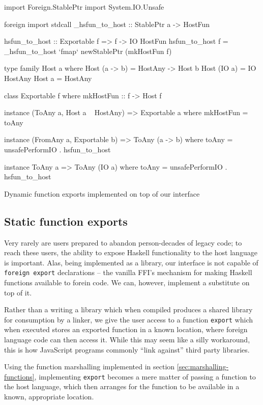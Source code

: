 \documentclass[preprint]{sigplanconf}
\begin{document}
\begin{listingfloat}
\begin{code}
import Foreign.StablePtr
import System.IO.Unsafe

foreign import stdcall
  _hsfun_to_host :: StablePtr a -> HostFun

hsfun_to_host :: Exportable f => f -> IO HostFun
hsfun_to_host f =
  _hsfun_to_host `fmap` newStablePtr (mkHostFun f)

type family Host a where
  Host (a -> b) = HostAny -> Host b
  Host (IO a)   = IO HostAny
  Host a        = HostAny

class Exportable f where
  mkHostFun :: f -> Host f

instance (ToAny a, Host a ~ HostAny) =>
          Exportable a where
  mkHostFun = toAny

instance (FromAny a, Exportable b) =>
          ToAny (a -> b) where
  toAny = unsafePerformIO . hsfun_to_host

instance ToAny a => ToAny (IO a) where
  toAny = unsafePerformIO . hsfun_to_host
\end{code}
\caption{Dynamic function exports implemented on top of our interface}
\label{lst:export-final}
\end{listingfloat}

\subsection{Static function exports}
\label{sec:exports}
Very rarely are users prepared to abandon person-decades of legacy code;
to reach these users, the ability to expose Haskell functionality to the host
language is important. Alas, being implemented as a library, our interface is
not capable of \lstinline!foreign export! declarations -- the vanilla FFI's
mechanism for making Haskell functions available to forein code. We can, however,
implement a substitute on top of it.

Rather than a writing a library which when compiled produces a shared library
for consumption by a linker, we give the user access to a function
\lstinline!export! which when executed stores an exported function in a
known location, where foreign language code can then access it.
While this may seem like a silly workaround, this is how JavaScript programs
commonly ``link against'' third party libraries.

Using the function marshalling implemented in section
\ref{sec:marshalling-functions}, implementing \lstinline!export! becomes a
mere matter of passing a function to the host language, which then
arranges for the function to be available in a known, appropriate location.
\end{document}
